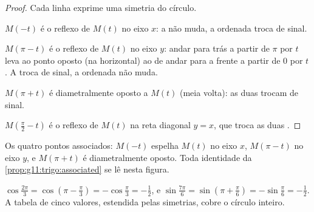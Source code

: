 \begin{proof}
Cada linha exprime uma simetria do círculo.

$M(-t)$ é o reflexo de $M(t)$ no eixo $x$: a  não muda, a
ordenada troca de sinal.

$M(\pi - t)$ é o reflexo de $M(t)$ no eixo $y$: andar para trás a partir
de $\pi$ por $t$ leva ao ponto oposto (na horizontal) ao de andar para a
frente a partir de $0$ por $t$. A  troca de sinal, a ordenada não
muda.

$M(\pi + t)$ é diametralmente oposto a $M(t)$ (meia volta): as duas
 trocam de sinal.

$M\!\left(\frac\pi2 - t\right)$ é o reflexo de $M(t)$ na reta diagonal
$y = x$, que troca as duas .
\end{proof}

\begin{omfigure}

{\small Os quatro pontos associados: $M(-t)$ espelha $M(t)$ no eixo $x$,
$M(\pi - t)$ no eixo $y$, e $M(\pi + t)$ é diametralmente oposto. Toda
identidade da \cref{prop:g11:trigo:associated} se lê nesta figura.}
\end{omfigure}

\begin{example}
$\cos\frac{2\pi}{3} = \cos\left(\pi - \frac\pi3\right)
= -\cos\frac\pi3 = -\frac12$, e
$\sin\frac{7\pi}{6} = \sin\left(\pi + \frac\pi6\right)
= -\sin\frac\pi6 = -\frac12$. A tabela de cinco valores, estendida pelas
simetrias, cobre o círculo inteiro.
\end{example}

